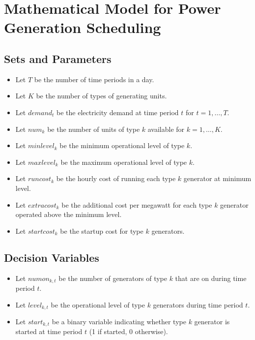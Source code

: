 \documentclass{article}
\begin{document}
\section*{Mathematical Model for Power Generation Scheduling}

\subsection*{Sets and Parameters}
\begin{itemize}
    \item Let \( T \) be the number of time periods in a day.
    \item Let \( K \) be the number of types of generating units.
    \item Let \( demand_t \) be the electricity demand at time period \( t \) for \( t = 1, \ldots, T \).
    \item Let \( num_k \) be the number of units of type \( k \) available for \( k = 1, \ldots, K \).
    \item Let \( minlevel_k \) be the minimum operational level of type \( k \).
    \item Let \( maxlevel_k \) be the maximum operational level of type \( k \).
    \item Let \( runcost_k \) be the hourly cost of running each type \( k \) generator at minimum level.
    \item Let \( extracost_k \) be the additional cost per megawatt for each type \( k \) generator operated above the minimum level.
    \item Let \( startcost_k \) be the startup cost for type \( k \) generators.
\end{itemize}

\subsection*{Decision Variables}
\begin{itemize}
    \item Let \( numon_{k,t} \) be the number of generators of type \( k \) that are on during time period \( t \).
    \item Let \( level_{k,t} \) be the operational level of type \( k \) generators during time period \( t \). 
    \item Let \( start_{k,t} \) be a binary variable indicating whether type \( k \) generator is started at time period \( t \) (1 if started, 0 otherwise).
\end{itemize}
\end{document}
